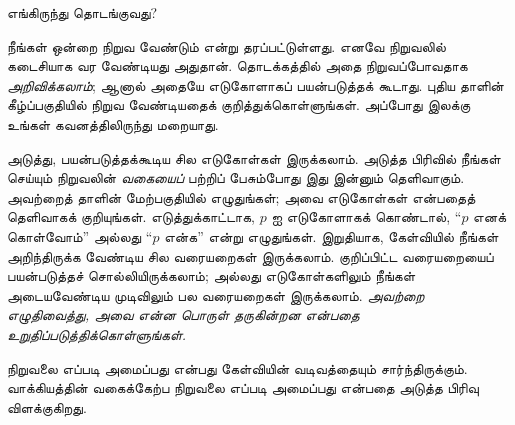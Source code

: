\documentclass[../../../include/open-logic-section]{subfiles}
\begin{document}


எங்கிருந்து தொடங்குவது?

நீங்கள் ஒன்றை நிறுவ வேண்டும் என்று தரப்பட்டுள்ளது. எனவே
நிறுவலில் கடைசியாக வர வேண்டியது அதுதான். தொடக்கத்தில் அதை
நிறுவப்போவதாக \emph{அறிவிக்கலாம்}; ஆனால் அதையே எடுகோளாகப்
பயன்படுத்தக் கூடாது. புதிய தாளின் கீழ்ப்பகுதியில் நிறுவ
வேண்டியதைக் குறித்துக்கொள்ளுங்கள். அப்போது இலக்கு உங்கள்
கவனத்திலிருந்து மறையாது.

அடுத்து, பயன்படுத்தக்கூடிய சில எடுகோள்கள் இருக்கலாம்.
அடுத்த பிரிவில் நீங்கள் செய்யும் நிறுவலின் \emph{வகையைப்}
பற்றிப் பேசும்போது இது இன்னும் தெளிவாகும். அவற்றைத் தாளின்
மேற்பகுதியில் எழுதுங்கள்; அவை எடுகோள்கள் என்பதைத் தெளிவாகக்
குறியுங்கள். எடுத்துக்காட்டாக, $p$ ஐ எடுகோளாகக் கொண்டால்,
``$p$ எனக் கொள்வோம்'' அல்லது ``$p$ என்க'' என்று எழுதுங்கள்.
இறுதியாக, கேள்வியில் நீங்கள் அறிந்திருக்க வேண்டிய சில
வரையறைகள் இருக்கலாம். குறிப்பிட்ட வரையறையைப் பயன்படுத்தச்
சொல்லியிருக்கலாம்; அல்லது எடுகோள்களிலும் நீங்கள் அடையவேண்டிய
முடிவிலும் பல வரையறைகள் இருக்கலாம். \emph{அவற்றை எழுதிவைத்து,
அவை என்ன பொருள் தருகின்றன என்பதை உறுதிப்படுத்திக்கொள்ளுங்கள்.}

நிறுவலை எப்படி அமைப்பது என்பது கேள்வியின் வடிவத்தையும்
சார்ந்திருக்கும். வாக்கியத்தின் வகைக்கேற்ப நிறுவலை எப்படி
அமைப்பது என்பதை அடுத்த பிரிவு விளக்குகிறது.
\end{document}
